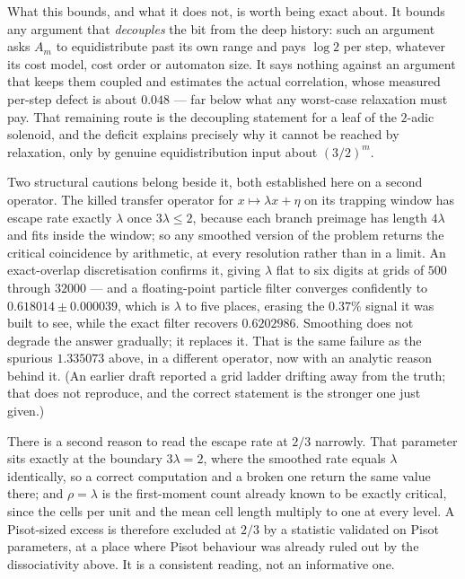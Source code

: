 \documentclass[11pt]{article}
\theoremstyle{remark}
\newcommand{\lam}{\lambda}
\begin{document}
What this bounds, and what it does not, is worth being exact about. It bounds any argument that
\emph{decouples} the bit from the deep history: such an argument asks $A_m$ to equidistribute past its own
range and pays $\log2$ per step, whatever its cost model, cost order or automaton size. It says nothing
against an argument that keeps them coupled and estimates the actual correlation, whose measured
per-step defect is about $0.048$ --- far below what any worst-case relaxation must pay. That remaining
route is the decoupling statement for a leaf of the $2$-adic solenoid, and the deficit explains precisely
why it cannot be reached by relaxation, only by genuine equidistribution input about $(3/2)^m$.

Two structural cautions belong beside it, both established here on a second operator. The killed transfer
operator for $x\mapsto\lam x+\eta$ on its trapping window has escape rate exactly $\lam$ once
$3\lam\le2$, because each branch preimage has length $4\lam$ and fits inside the window; so any smoothed
version of the problem returns the critical coincidence by arithmetic, at every resolution rather than in
a limit. An exact-overlap discretisation confirms it, giving $\lam$ flat to six digits at grids of $500$
through $32000$ --- and a floating-point particle filter converges confidently to
$0.618014\pm0.000039$, which is $\lam$ to five places, erasing the $0.37\%$ signal it was built to see,
while the exact filter recovers $0.6202986$. Smoothing does not degrade the answer gradually; it replaces
it. That is the same failure as the spurious $1.335073$ above, in a different operator, now with an
analytic reason behind it. (An earlier draft reported a grid ladder drifting away from the truth; that
does not reproduce, and the correct statement is the stronger one just given.)

There is a second reason to read the escape rate at $2/3$ narrowly. That parameter sits exactly at the
boundary $3\lam=2$, where the smoothed rate equals $\lam$ identically, so a correct computation and a
broken one return the same value there; and $\rho=\lam$ is the first-moment count already known to be
exactly critical, since the cells per unit and the mean cell length multiply to one at every level. A
Pisot-sized excess is therefore excluded at $2/3$ by a statistic validated on Pisot parameters, at a
place where Pisot behaviour was already ruled out by the dissociativity above. It is a consistent
reading, not an informative one.
\end{document}
